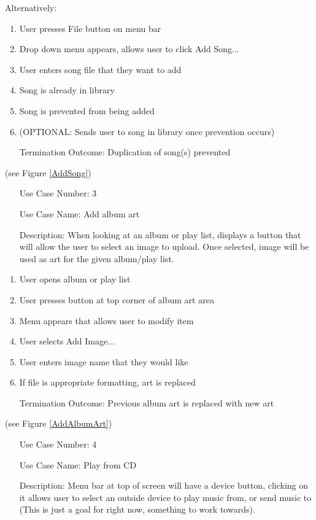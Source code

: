 \documentclass[10pt,conference,onecolumn,compsoc]{IEEEtran}
\begin{document}
Alternatively:
\begin{enumerate}
\item User presses File button on menu bar
\item Drop down menu appears, allows user to click Add Song...
\item User enters song file that they want to add
\item Song is already in library
\item Song is prevented from being added
\item (OPTIONAL: Sends user to song in library once prevention occurs)
\item [Termination Outcome:] Duplication of song(s) prevented
\end{enumerate}

(see Figure \ref{AddSong})

\begin{itemize}
\item[Use Case Number:] 3
\item[Use Case Name:] Add album art
\item[Description:] When looking at an album or play list, displays a button that will allow the user to select an image to upload. Once selected, image will be used as art for the given album/play list.
\end{itemize}

\begin{enumerate}
\item User opens album or play list
\item User presses button at top corner of album art area
\item Menu appears that allows user to modify item
\item User selects Add Image...
\item User enters image name that they would like
\item If file is appropriate formatting, art is replaced
\item [Termination Outcome:] Previous album art is replaced with new art
\end{enumerate}

(see Figure \ref{AddAlbumArt})

\begin{itemize}
\item[Use Case Number:] 4
\item[Use Case Name:] Play from CD
\item[Description:] Menu bar at top of screen will have a device button, clicking on it allows user to select an outside device to play music from, or send music to (This is just a goal for right now, something to work towards).
\end{itemize}
\end{document}
